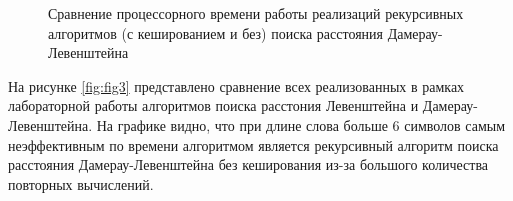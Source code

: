 \begin{figure}[h!]
	
	
	\caption{Сравнение процессорного времени работы реализаций рекурсивных алгоритмов (с кешированием и без) поиска расстояния Дамерау-Левенштейна}
	
	\label{fig:fig2}
	
\end{figure}

\FloatBarrier
На рисунке \ref{fig:fig3} представлено сравнение всех реализованных в рамках лабораторной работы алгоритмов поиска расстония Левенштейна и Дамерау-Левенштейна. На графике видно, что при длине слова больше 6 символов самым неэффективным по времени алгоритмом является рекурсивный алгоритм поиска расстояния Дамерау-Левенштейна без кеширования из-за большого количества повторных вычислений.
\\
\\
\\
\\
\\
\\


